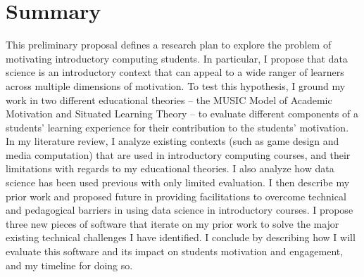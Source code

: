 \section{Summary}

This preliminary proposal defines a research plan to explore the problem of motivating introductory computing students.
In particular, I propose that data science is an introductory context that can appeal to a wide ranger of learners across multiple dimensions of motivation.
To test this hypothesis, I ground my work in two different educational theories -- the MUSIC Model of Academic Motivation and Situated Learning Theory -- to evaluate different components of a students' learning experience for their contribution to the students' motivation.
In my literature review, I analyze existing contexts (such as game design and media computation) that are used in introductory computing courses, and their limitations with regards to my educational theories.
I also analyze how data science has been used previous with only limited evaluation.
I then describe my prior work and proposed future in providing facilitations to overcome technical and pedagogical barriers in using data science in introductory courses.
I propose three new pieces of software that iterate on my prior work to solve the major existing technical challenges I have identified.
I conclude by describing how I will evaluate this software and its impact on students motivation and engagement, and my timeline for doing so.